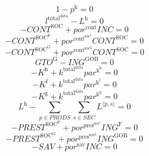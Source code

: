 \begin{equation}
1 - p^{\mathrm{k}} = 0
\end{equation}
\begin{equation}
l^{\mathrm{total}^{\mathrm{data}}} - L^{\mathrm{h}} = 0
\end{equation}
\begin{equation}
-{C\!O\!N\!T}^{\mathrm{SOC}} + {{p\!o\!r}^{\mathrm{cont}}} {{I\!N\!C}} = 0
\end{equation}
\begin{equation}
-{C\!O\!N\!T}^{\mathrm{SOC}^{\mathrm{F}}} + {{p\!o\!r}^{\mathrm{cont}^{\mathrm{soc}^{\mathrm{f}}}}} {{C\!O\!N\!T}^{\mathrm{SOC}}} = 0
\end{equation}
\begin{equation}
-{C\!O\!N\!T}^{\mathrm{SOC}^{\mathrm{G}}} + {{p\!o\!r}^{\mathrm{cont}^{\mathrm{soc}^{\mathrm{g}}}}} {{C\!O\!N\!T}^{\mathrm{SOC}}} = 0
\end{equation}
\begin{equation}
{G\!T\!O}^{\mathrm{G}} - {I\!N\!G}^{\mathrm{GOB}} = 0
\end{equation}
\begin{equation}
-K^{\mathrm{h}} + {k^{\mathrm{total}^{\mathrm{data}}}} {{p\!a\!r}^{\mathrm{k}^{\mathrm{h}}}} = 0
\end{equation}
\begin{equation}
-K^{\mathrm{f}} + {k^{\mathrm{total}^{\mathrm{data}}}} {{p\!a\!r}^{\mathrm{k}^{\mathrm{f}}}} = 0
\end{equation}
\begin{equation}
-K^{\mathrm{g}} + {k^{\mathrm{total}^{\mathrm{data}}}} {{p\!a\!r}^{\mathrm{k}^{\mathrm{g}}}} = 0
\end{equation}
\begin{equation}
L^{\mathrm{h}} - \sum_{p\in {P\!R\!O\!D\!S}} \sum_{s\in {S\!E\!C}} {L}^{\langle p,s\rangle} = 0
\end{equation}
\begin{equation}
-{P\!R\!E\!S\!T}^{\mathrm{SOC}^{\mathrm{F}}} + {{p\!o\!r}^{\mathrm{pres}^{\mathrm{soc}^{\mathrm{f}}}}} {{I\!N\!G}^{\mathrm{F}}} = 0
\end{equation}
\begin{equation}
-{P\!R\!E\!S\!T}^{\mathrm{SOC}^{\mathrm{G}}} + {{p\!o\!r}^{\mathrm{pres}^{\mathrm{soc}^{\mathrm{g}}}}} {{I\!N\!G}^{\mathrm{GOB}}} = 0
\end{equation}
\begin{equation}
-{S\!A\!V} + {{p\!o\!r}^{\mathrm{sav}}} {{I\!N\!C}} = 0
\end{equation}
